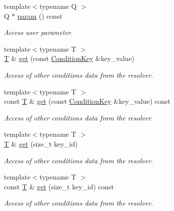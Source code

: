 \begin{DoxyCompactItemize}
{\footnotesize template$<$typename Q $>$ }\\Q $\ast$ \hyperlink{class_d_d4hep_1_1_conditions_1_1_condition_update_context_aac0cc2ba0b37615704bf8e24bd5942de}{param} () const
\begin{DoxyCompactList}\small\item\em Access user parameter. \end{DoxyCompactList}\item 
{\footnotesize template$<$typename T $>$ }\\\hyperlink{class_t}{T} \& \hyperlink{class_d_d4hep_1_1_conditions_1_1_condition_update_context_a436fabf5620b157ae53005d8ac1b7bde}{get} (const \hyperlink{class_d_d4hep_1_1_conditions_1_1_condition_key}{Condition\+Key} \&key\+\_\+value)
\begin{DoxyCompactList}\small\item\em Access of other conditions data from the resolver. \end{DoxyCompactList}\item 
{\footnotesize template$<$typename T $>$ }\\const \hyperlink{class_t}{T} \& \hyperlink{class_d_d4hep_1_1_conditions_1_1_condition_update_context_a038d03fe818890783726b1e632f10d83}{get} (const \hyperlink{class_d_d4hep_1_1_conditions_1_1_condition_key}{Condition\+Key} \&key\+\_\+value) const
\begin{DoxyCompactList}\small\item\em Access of other conditions data from the resolver. \end{DoxyCompactList}\item 
{\footnotesize template$<$typename T $>$ }\\\hyperlink{class_t}{T} \& \hyperlink{class_d_d4hep_1_1_conditions_1_1_condition_update_context_ad3a02c60524b952ec75238a197353a7b}{get} (size\+\_\+t key\+\_\+id)
\begin{DoxyCompactList}\small\item\em Access of other conditions data from the resolver. \end{DoxyCompactList}\item 
{\footnotesize template$<$typename T $>$ }\\const \hyperlink{class_t}{T} \& \hyperlink{class_d_d4hep_1_1_conditions_1_1_condition_update_context_a2cae217c5f09d132ceee40d8aeba807d}{get} (size\+\_\+t key\+\_\+id) const
\begin{DoxyCompactList}\small\item\em Access of other conditions data from the resolver. \end{DoxyCompactList}\end{DoxyCompactItemize}
